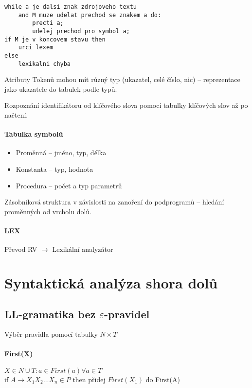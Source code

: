 \documentclass[a4paper, 11pt]{report}
\begin{document}
\begin{lstlisting}
while a je dalsi znak zdrojoveho textu
	and M muze udelat prechod se znakem a do:
		precti a;
		udelej prechod pro symbol a;
if M je v koncovem stavu then
	urci lexem
else
	lexikalni chyba
\end{lstlisting}

Atributy Tokenů mohou mít různý typ (ukazatel, celé číslo, nic) -- reprezentace jako ukazatele do tabulek podle typů.

Rozpoznání identifikátoru od klíčového slova pomocí tabulky klíčových slov až po načtení.

\paragraph{Tabulka symbolů}

\begin{itemize}
	\item Proměnná -- jméno, typ, délka
	\item Konstanta -- typ, hodnota
	\item Procedura -- počet a typ parametrů
\end{itemize}

Zásobníková struktura v závislosti na zanoření do podprogramů -- hledání proměnných od vrcholu dolů.

\paragraph{LEX} Převod RV $\to$ Lexikální analyzátor


\section{Syntaktická analýza shora dolů}

\subsection{LL-gramatika bez $\varepsilon$-pravidel}
Výběr pravidla pomocí tabulky $N \times T$

\paragraph{First(X)}
$X \in N \cup T: a \in First(a) \forall a \in T$ \\
if $A \to X_1 X_2 \dots X_n \in P$ then přidej $First(X_1)$ do First(A)
\end{document}
